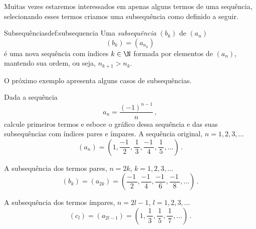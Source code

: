 Muitas vezes estaremos interessados em apenas alguns termos de uma sequência,
selecionando esses termos criamos uma subsequência como definido a seguir.

\begin{definicao}{Subsequências}{def:subsequencia}
	Uma \emph{subsequência} $(b_k)$ de $(a_n)$
  \[
    (b_k) = (a_{n_k})
  \]
  é uma nova sequência com índices $k\in\N$
	formada por elementos de $(a_n)$, mantendo sua ordem, ou seja, $n_{k+1}>n_k$.
\end{definicao}

O próximo exemplo apresenta alguns casos de subsequências.

\begin{example}
  Dada a sequência
  \[
    a_n = \frac{(-1)^{n-1}}{n} \,,
  \]
  calcule primeiros termos e esboce o gráfico dessa sequência e das suas subsequências com
  índices pares e ímpares.
	\solution
	A sequência original, $n = 1, 2, 3, \dots$
	\[
	  (a_n) = \left( 1, \frac{-1\,}{  2  },
                      \frac{ 1  }{\,3\,},
                      \frac{-1\,}{  4  },
                      \frac{ 1  }{\,5\,}, \dots \right) \,.
	\]
  \begin{center}
    \vspace{-\baselineskip}
    
    \vspace{-\baselineskip}
  \end{center}
	A subsequência dos termos pares, $n = 2k$, $k = 1, 2, 3, \dots$
	\[
		(b_k) = \left(a_{2k}\right)
          = \left( \frac{-1\,}{2},
                   \frac{-1\,}{4},
                   \frac{-1\,}{6},
                   \frac{-1\,}{8}, \dots \right)  \,.
	\]
  \begin{center}
    \vspace{-\baselineskip}
    
    \vspace{-\baselineskip}
  \end{center}
	A subsequência dos termos ímpares, $n = 2l-1$, $l = 1, 2, 3, \dots$
	\[
		(c_l) = \left(a_{2l-1}\right)
          = \left( 1, \frac{1}{\,3\,},
                      \frac{1}{\,5\,},
                      \frac{1}{\,7\,}, \ldots \right)   \,.
	\]
  \begin{center}
    \vspace{-\baselineskip}
    
  \end{center}
\end{example}

